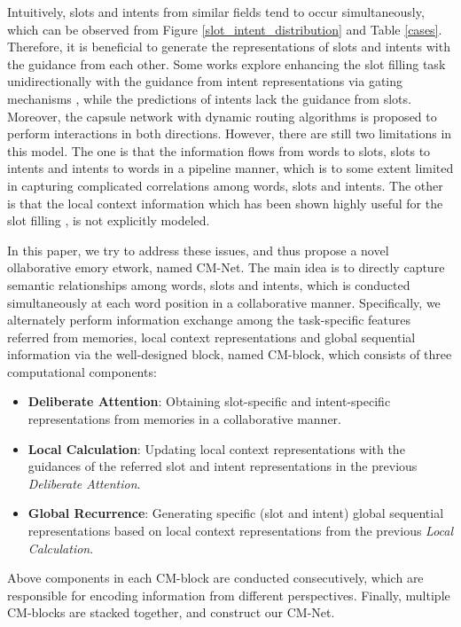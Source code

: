 \documentclass[11pt,a4paper]{article}
\begin{document}
Intuitively, slots and intents from similar fields tend to occur simultaneously, which can be observed from Figure \ref{slot_intent_distribution} and Table \ref{cases}. 
Therefore, it is beneficial to generate the representations of slots and intents with the guidance from each other.
Some works explore enhancing the slot filling task unidirectionally with the guidance from intent representations via gating mechanisms \cite{slot_gated_2018, self_attentive_2018}, while the predictions of intents lack the guidance from slots.
Moreover, the capsule network with dynamic routing algorithms \cite{capsule_2018} is proposed to perform interactions in both directions. However, there are still two limitations in this model. The one is that the information flows from words to slots, slots to intents and intents to words in a pipeline manner, which is to some extent limited in capturing complicated correlations among words, slots and intents. 
The other is that the local context information which has been shown highly useful for the slot filling \cite{local_window_2014}, is not explicitly modeled.


In this paper, we try to address these issues, and thus propose a novel ollaborative emory etwork, named CM-Net. The main idea is to directly capture semantic relationships among words, slots and intents, which is conducted simultaneously at each word position in a collaborative manner. Specifically, we alternately perform information exchange among the task-specific features referred from memories, local context representations and global sequential information via the well-designed block, named CM-block, which consists of three computational components: 
\begin{itemize}
\item \textbf{Deliberate Attention}: 
Obtaining slot-specific and intent-specific representations from memories in a collaborative manner. 


\item \textbf{Local Calculation}: 
Updating local context representations with the guidances of the referred slot and intent representations in the previous \emph{Deliberate Attention}. \vspace{-3pt}
\item \textbf{Global Recurrence}: Generating specific (slot and intent) global sequential representations based on local context representations
from the previous \emph{Local Calculation}.
\end{itemize}
Above components in each CM-block are conducted consecutively, which are responsible for encoding information from different perspectives.
Finally, multiple CM-blocks are stacked together, and  construct our CM-Net. 
\end{document}
